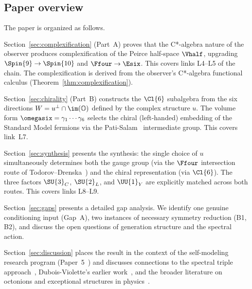 \subsection{Paper overview}
\label{subsec:overview}

The paper is organized as follows.

Section~\ref{sec:complexification} (Part~A) proves that the C*-algebra nature
of the observer produces complexification of the Peirce half-space $\Vhalf$,
upgrading $\Spin{9} \to \Spin{10}$ and $\Ffour \to \Esix$.  This covers
links L4--L5 of the chain.  The complexification is derived from the
observer's C*-algebra functional calculus (Theorem~\ref{thm:complexification}).

Section~\ref{sec:chirality} (Part~B) constructs the $\Cl{6}$ subalgebra
from the six directions $W = u^{\perp} \cap \im(\mathbb{O})$ defined by the
complex structure $u$. The volume form $\omegasix = \gamma_1 \cdots
\gamma_6$ selects the chiral (left-handed) embedding of the Standard Model
fermions via the Pati-Salam~\cite{PatiSalam1974} intermediate group. This
covers link~L7.

Section~\ref{sec:synthesis} presents the synthesis: the single choice of $u$
simultaneously determines both the gauge group (via the $\Ffour$ intersection
route of Todorov--Drenska~\cite{TodorovDrenska2018}) and the chiral
representation (via $\Cl{6}$). The three factors $\SU{3}_C$, $\SU{2}_L$, and
$\UU{1}_Y$ are explicitly matched across both routes. This covers links
L8--L9.

Section~\ref{sec:gaps} presents a detailed gap analysis. We identify one
genuine conditioning input (Gap~A), two instances of necessary symmetry
reduction (B1, B2), and discuss the open questions of generation
structure and the spectral action.

Section~\ref{sec:discussion} places the result in the context of the
self-modeling research program (Paper~5~\cite{Paper5}) and
discusses connections to the spectral triple approach~\cite{CCM2007},
Dubois-Violette's earlier work~\cite{DuboisViolette2016}, and the broader
literature on octonions and exceptional structures in
physics~\cite{Baez2002, Yokota2009}.
